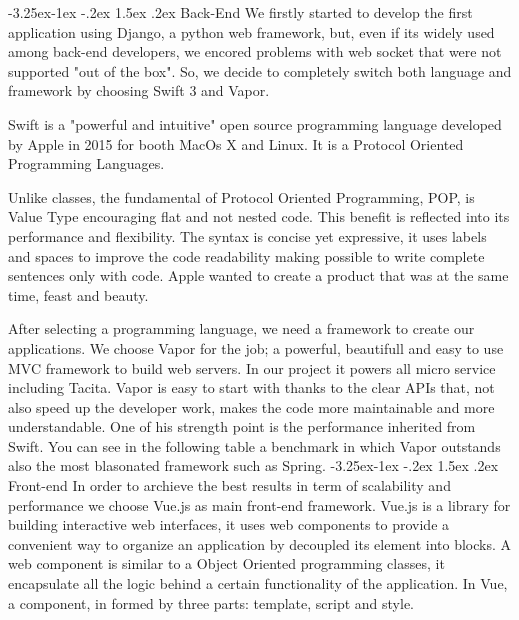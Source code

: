\documentclass[]{usiinfbachelorproject}
\makeatletter
\newcommand\subsubsection{\@startsection{subsubsection}{3}{\z@}%
                {-3.25ex\@plus -1ex \@minus -.2ex}%
                {1.5ex \@plus .2ex}%
                {\normalfont\normalsize\bfseries}}
\makeatother
\begin{document}
\subsubsection{Back-End}
We firstly started to develop the first application using Django, a python web framework, but, even if its widely used among back-end developers, we encored problems with web socket that were not supported "out of the box".
So, we decide to completely switch both language and framework by choosing Swift 3 and Vapor.

Swift is a "powerful and intuitive" open source programming language developed by Apple in 2015 for booth MacOs X and Linux. It is a Protocol Oriented Programming Languages.

Unlike classes, the fundamental of Protocol Oriented Programming, POP, is Value Type encouraging flat and not nested code. This benefit is reflected into its performance and flexibility.
The syntax is concise yet expressive, it uses labels and spaces to improve the code readability making possible to write complete sentences only with code. Apple wanted to create a product that was at the same time, feast and beauty.

After selecting a programming language, we need a framework to create our applications. We choose Vapor for the job; a powerful, beautifull and easy to use MVC framework to build web servers. In our project it powers all micro service including Tacita.
Vapor is easy to start with thanks to the clear APIs that, not also speed up the developer work, makes the code more maintainable and more understandable. One of his strength point is the performance inherited from Swift. You can see in the following table a benchmark in which Vapor outstands also the most blasonated framework such as Spring.
\subsubsection{Front-end}
In order to archieve the best results in term of scalability and performance we choose Vue.js as main front-end framework. Vue.js is a library for building interactive web interfaces, it uses web components to provide a convenient way to organize an application by decoupled its element into blocks.
A web component is similar to a Object Oriented programming classes, it encapsulate all the logic behind a certain functionality of the application. In Vue, a component, in formed by three parts: template, script and style.
\end{document}
